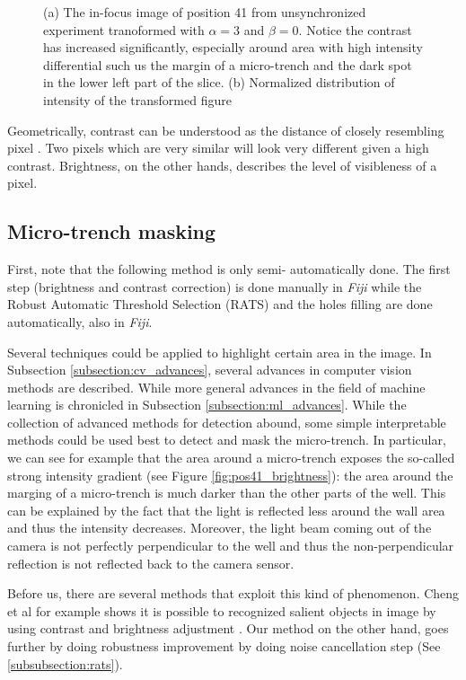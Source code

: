 \documentclass[pdftex,12pt,a4paper]{report}
\begin{document}
\begin{figure}[H]
\label{fig:pos41_times3}
\caption{(a) The in-focus image of position 41 from unsynchronized experiment tranoformed with $\alpha=3$ and $\beta = 0$. Notice the contrast has increased significantly, especially around area with high intensity differential such us the margin of a micro-trench and the dark spot in the lower left part of the slice. (b) Normalized distribution of intensity of the transformed figure}
\end{figure}

Geometrically, contrast can be understood as the distance of closely resembling pixel \cite{hartley2003multiple}. Two pixels which are very similar will look very different given a high contrast. Brightness, on the other hands, describes the level of visibleness of a pixel.

\subsection{Micro-trench masking}
\label{subsection:micro_trench_masking}

First, note that the following method is only semi- automatically done. The first step (brightness and contrast correction) is done manually in \textit{Fiji} while the Robust Automatic Threshold Selection (RATS) and the holes filling are done automatically, also in \textit{Fiji}.

Several techniques could be applied to highlight certain area in the image. In Subsection \ref{subsection:cv_advances}, several advances in computer vision methods are described. While more general advances in the field of machine learning is chronicled in Subsection \ref{subsection:ml_advances}. While the collection of advanced methods for detection abound, some simple interpretable methods could be used best to detect and mask the micro-trench. In particular,  we can see for example that the area around a micro-trench exposes the so-called strong intensity gradient (see Figure \ref{fig:pos41_brightness}): the area around the marging of a micro-trench is much darker than the other parts of the well. This can be explained by the fact that the light is reflected less around the wall area and thus the intensity decreases. Moreover, the light beam coming out of the camera is not perfectly perpendicular to the well and thus the non-perpendicular reflection is not reflected back to the camera sensor.

Before us, there are several methods that exploit this kind of phenomenon. Cheng et al for example shows it is possible to recognized salient objects in image by using contrast and brightness adjustment \cite{cheng2015global}. Our method on the other hand, goes further by doing robustness improvement by doing noise cancellation step (See \ref{subsubsection:rats}).
\end{document}
